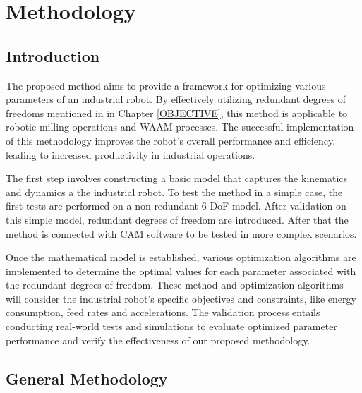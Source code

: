 \chapter{Methodology}%

\section{Introduction}%

The proposed method aims to provide a framework for optimizing various parameters of an industrial robot. By effectively utilizing redundant degrees of freedoms mentioned in in Chapter \ref{OBJECTIVE}, this method is applicable to robotic milling operations and WAAM processes. The successful implementation of this methodology improves the robot's overall performance and efficiency, leading to increased productivity in industrial operations.

The first step involves constructing a basic model that captures the kinematics and dynamics a the industrial robot. To test the method in a simple case, the first tests are performed on a non-redundant 6-DoF model. After validation on this simple model, redundant degrees of freedom are introduced. After that the method is connected with CAM software to be tested in more complex scenarios.

Once the mathematical model is established, various optimization algorithms are implemented to determine the optimal values for each parameter associated with the redundant degrees of freedom. These method and optimization algorithms will consider the industrial robot's specific objectives and constraints, like energy consumption, feed rates and accelerations.
The validation process entails conducting real-world tests and simulations to evaluate optimized parameter performance and verify the effectiveness of our proposed methodology.


\section{General Methodology}
